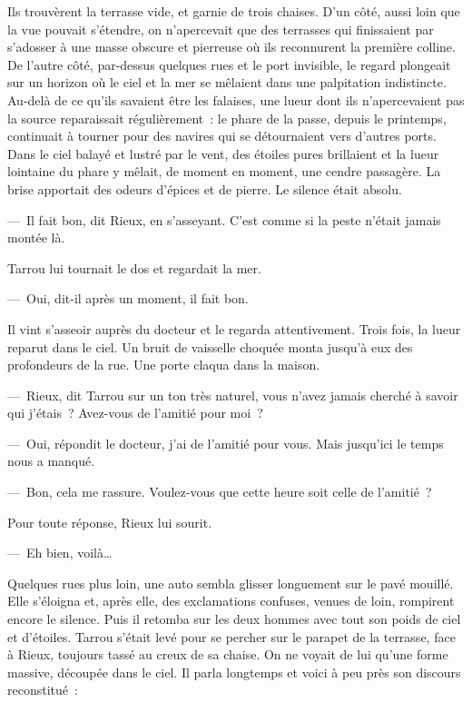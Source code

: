 \documentclass[french,twoside]{book} %
\begin{document}
Ils trouvèrent la terrasse vide, et garnie de trois chaises. D’un côté, aussi loin que la vue pouvait s’étendre, on n’apercevait que des terrasses qui finissaient par s’adosser à une masse obscure et pierreuse où ils reconnurent la première colline. De l’autre côté, par-dessus quelques rues et le port invisible, le regard plongeait sur un horizon où le ciel et la mer se mêlaient dans une palpitation indistincte. Au-delà de ce qu’ils savaient être les falaises, une lueur dont ils n’apercevaient pas la source reparaissait régulièrement : le phare de la passe, depuis le printemps, continuait à tourner pour des navires qui se détournaient vers d’autres ports. Dans le ciel balayé et lustré par le vent, des étoiles pures brillaient et la lueur lointaine du phare y mêlait, de moment en moment, une cendre passagère. La brise apportait des odeurs d’épices et de pierre. Le silence était absolu.\par
— Il fait bon, dit Rieux, en s’asseyant. C’est comme si la peste n’était jamais montée là.\par
Tarrou lui tournait le dos et regardait la mer.\par
— Oui, dit-il après un moment, il fait bon.\par
Il vint s’asseoir auprès du docteur et le regarda attentivement. Trois fois, la lueur reparut dans le ciel. Un bruit de vaisselle choquée monta jusqu’à eux des profondeurs de la rue. Une porte claqua dans la maison.\par
— Rieux, dit Tarrou sur un ton très naturel, vous n’avez jamais cherché à savoir qui j’étais ? Avez-vous de l’amitié pour moi ?\par
— Oui, répondit le docteur, j’ai de l’amitié pour vous. Mais jusqu’ici le temps nous a manqué.\par
— Bon, cela me rassure. Voulez-vous que cette heure soit celle de l’amitié ?\par
Pour toute réponse, Rieux lui sourit.\par
— Eh bien, voilà…\par
Quelques rues plus loin, une auto sembla glisser longuement sur le pavé mouillé. Elle s’éloigna et, après elle, des exclamations confuses, venues de loin, rompirent encore le silence. Puis il retomba sur les deux hommes avec tout son poids de ciel et d’étoiles. Tarrou s’était levé pour se percher sur le parapet de la terrasse, face à Rieux, toujours tassé au creux de sa chaise. On ne voyait de lui qu’une forme massive, découpée dans le ciel. Il parla longtemps et voici à peu près son discours reconstitué :\par
\end{document}
